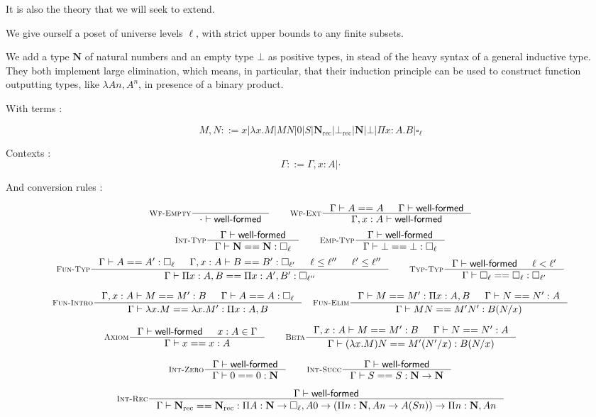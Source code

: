 \documentclass[11pt]{article}
\DeclareMathOperator{\rec}{rec}
\newcommand{\0}{\mathbf{0}}
\newcommand{\1}{\mathbf{1}}
\newcommand{\nat}{\mathbf{N}}
\newcommand{\tctx}{\Gamma}
\newcommand{\Wf}{\textsf{well-formed}}
\begin{document}
It is also the theory that we will seek to extend.

We give ourself a poset of universe levels $\ell$, with strict upper bounds to any finite subsets.

We add a type $\nat$ of natural numbers and an empty type $\bot$ as positive types, in stead of the heavy syntax of a general inductive type. They both implement large elimination, which means, in particular, that their induction principle can be used to construct function outputting types, like $\lambda A n, A^n$, in presence of a binary product.

With terms :

$$ M,N ::= x | \lambda x. M | MN | 0 | S | \nat_{\rec} | \bot_{\rec} | \nat | \bot | \Pi x :A.B | \square_\ell $$


Contexts :
$$ \tctx ::= \tctx, x : A | \cdot $$

And conversion rules :

$$
    \inference[\textsc{Wf-Empty}]{}{\cdot |- \Wf} \qquad
    \inference[\textsc{Wf-Ext}]{\tctx |- A == A & \tctx |- \Wf}{ \tctx, x : A |- \Wf}
$$
$$
    \inference[\textsc{Int-Typ}]{\tctx |- \Wf}{\tctx |- \nat == \nat : \square_\ell} \qquad
    \inference[\textsc{Emp-Typ}]{\tctx |- \Wf}{\tctx |- \bot == \bot : \square_\ell}
$$
$$
    \inference[\textsc{Fun-Typ}]{\tctx |- A == A' : \square_\ell & \tctx, x : A |- B == B' : \square_{\ell'} & \ell \leq \ell'' & \ell' \leq \ell''}{\tctx |- \Pi x  : A, B == \Pi x: A', B' : \square_{\ell''}} \qquad
    \inference[\textsc{Typ-Typ}]{\tctx |- \Wf & \ell < \ell' }{\tctx |- \square_\ell == \square_\ell: \square_{\ell'}}
$$


$$
    \inference[\textsc{Fun-Intro}]{\tctx, x : A |- M == M' : B &\tctx |- A == A : \square_\ell}{\tctx |- \lambda x. M == \lambda x. M' : \Pi x : A, B} \quad
    \inference[\textsc{Fun-Elim}]{\tctx |- M == M' : \Pi x:A, B& \tctx |- N == N' : A}{\tctx |- MN == M'N' : B(N/x)}
$$

$$
    \inference[\textsc{Axiom}]{\tctx |- \Wf & x : A \in \tctx }{\tctx |- x == x : A} \qquad
    \inference[\textsc{Beta}]{\tctx, x : A |- M == M' : B & \tctx |- N == N' : A}{\tctx |- (\lambda x. M)N == M'(N'/x) : B(N/x)}
$$

$$
    \inference[\textsc{Int-Zero}]{\tctx |- \Wf}{\tctx |- 0 == 0 : \nat} \qquad
    \inference[\textsc{Int-Succ}]{\tctx |- \Wf}{\tctx |- S == S : \nat -> \nat}
$$

$$
    \inference[\textsc{Int-Rec}]{\tctx |- \Wf}{\tctx |- \nat_{\rec} == \nat_{\rec} : \Pi A : \nat \to \square_\ell, A 0 \to \left(\Pi n:\nat, A n \to A (S n)\right) \to \Pi n :\nat, A n}
$$
\end{document}
